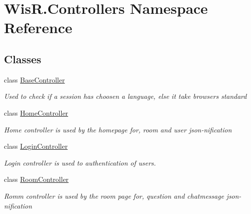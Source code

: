 \hypertarget{namespace_wis_r_1_1_controllers}{}\section{Wis\+R.\+Controllers Namespace Reference}
\label{namespace_wis_r_1_1_controllers}
\subsection*{Classes}
\begin{DoxyCompactItemize}
\item 
class \hyperlink{class_wis_r_1_1_controllers_1_1_base_controller}{Base\+Controller}
\begin{DoxyCompactList}\small\item\em Used to check if a session has choosen a language, else it take browsers standard \end{DoxyCompactList}\item 
class \hyperlink{class_wis_r_1_1_controllers_1_1_home_controller}{Home\+Controller}
\begin{DoxyCompactList}\small\item\em Home controller is used by the homepage for, room and user json-\/nification \end{DoxyCompactList}\item 
class \hyperlink{class_wis_r_1_1_controllers_1_1_login_controller}{Login\+Controller}
\begin{DoxyCompactList}\small\item\em Login controller is used to authentication of users. \end{DoxyCompactList}\item 
class \hyperlink{class_wis_r_1_1_controllers_1_1_room_controller}{Room\+Controller}
\begin{DoxyCompactList}\small\item\em Romm controller is used by the room page for, question and chatmessage json-\/nification \end{DoxyCompactList}\end{DoxyCompactItemize}
